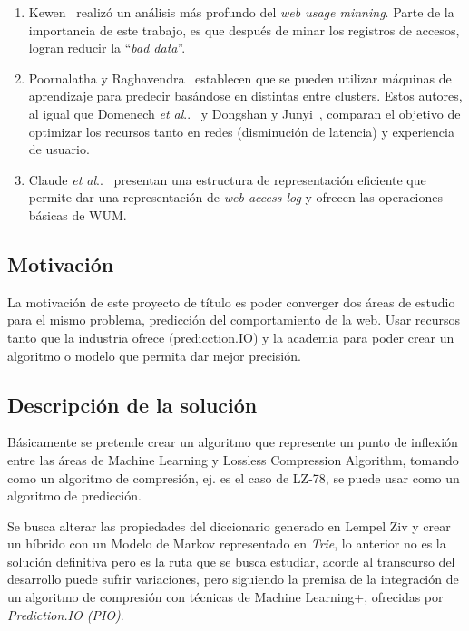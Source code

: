 \documentclass{udparticle}
\makeatletter
\DeclareRobustCommand\onedot{\futurelet\@let@token\@onedot}
\newcommand\@onedot{\ifx\@let@token.\else.\null\fi\xspace}
\newcommand\etal{\emph{et al}\onedot}
\makeatother
\begin{document}
\begin{enumerate}
  \item Kewen~\cite{kewen2012} realizó un análisis más profundo del \emph{web usage minning}.
  Parte de la importancia de este trabajo, es que después de minar los registros de accesos, logran reducir la ``\emph{bad data}''.

  \item Poornalatha y Raghavendra~\cite{Poornalatha2012} establecen que se pueden utilizar máquinas de aprendizaje para predecir basándose en distintas entre clusters. Estos autores, al igual que Domenech \etal~\cite{Domenech2006} y Dongshan y Junyi~\cite{Dongshan2002}, comparan el objetivo de optimizar los recursos tanto en redes (disminución de latencia) y experiencia de usuario.

  \item Claude \etal~\cite{Claude2014} presentan una estructura de representación eficiente que permite dar una representación de \emph{web access log} y ofrecen las operaciones básicas de WUM.
\end{enumerate}


\subsection{Motivación}

La motivación de este proyecto de título es poder converger dos áreas de estudio para el mismo problema, predicción del comportamiento de la web. Usar recursos tanto que la industria ofrece (predicction.IO) y la academia para poder crear un algoritmo o modelo que permita dar mejor precisión.


\subsection{Descripción de la solución }
Básicamente se pretende crear un algoritmo que represente un punto de inflexión entre las áreas de Machine Learning y Lossless Compression Algorithm, tomando como un algoritmo de compresión, ej. es el caso de LZ-78, se puede usar como un algoritmo de predicción.

Se busca alterar las propiedades del diccionario generado en Lempel Ziv y crear un híbrido con un Modelo de Markov representado en \emph{Trie}, lo anterior no es la solución definitiva pero es la ruta que se busca estudiar, acorde al transcurso del desarrollo puede sufrir variaciones, pero siguiendo la premisa de la integración de un algoritmo de compresión con técnicas de Machine Learning+, ofrecidas por \textit{Prediction.IO (PIO)}.
\end{document}
